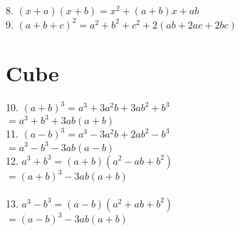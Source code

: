 \documentclass{article}
\begin{document}
8. $(x+a)(x+b) = x^2 + (a+b)x + ab$ \\ 

9. $(a+b+c)^2$\hspace{5.3mm}$ = a^2 + b^2 + c^2 + 2(ab+2ac+2bc)$\\

\section{Cube}
\hspace*{5mm}10. $(a+b)^3 $\hspace{5mm}$= a^3+3a^2b+3ab^2+b^3$\\
\hspace*{30.8mm}$=a^3+b^3+3ab(a+b)$ \\
	
11. $(a-b)^3 $\hspace{4.6mm}$= a^3 - 3a^2b+2ab^2-b^3$ \\ 
\hspace*{30.8mm}$=a^3-b^3-3ab(a-b)$ \\
 
12. $a^3 + b^3$\hspace{5.8mm}$ = (a+b)(a^2-ab+b^2)$\\ 
\hspace*{30.5mm}$=(a+b)^3 - 3ab(a+b)$\\ \\
\hspace*{5mm}13. $a^3-b^3 $\hspace{5.8mm}$= (a-b)(a^2+ab+b^2)$\\
\hspace*{30.5mm}$=(a-b)^3 - 3ab(a+b)$\\  
\end{document}
